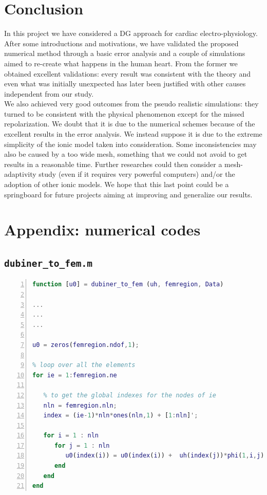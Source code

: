 \documentclass[a4paper,11pt]{article}
\begin{document}
\section{Conclusion}
In this project we have considered a DG approach for cardiac electro-physiology. After some introductions and motivations, we have validated the proposed numerical method through a basic error analysis and a couple of simulations aimed to re-create what happens in the human heart.
\noindent From the former we obtained excellent validations: every result was consistent with the theory and even what was initially unexpected has later been justified with other causes independent from our study.\\
\noindent We also achieved very good outcomes from the pseudo realistic simulations: they turned to be consistent with the physical phenomenon except for the missed repolarization. We doubt that it is due to the numerical schemes because of the excellent results in the error analysis. We instead suppose it is due to the extreme simplicity of the ionic model taken into consideration. Some inconsistencies may also be caused by a too wide mesh, something that we could not avoid to get results in a reasonable time. Further researches could then consider a mesh-adaptivity study (even if it requires very powerful computers) and/or the adoption of other ionic models.
\noindent We hope that this last point could be a springboard for future projects aiming at improving and generalize our results.  
\newpage
\section{Appendix: numerical codes}
\subsection{\texttt{dubiner\_to\_fem.m}}\label{dub_to_fem}
\begin{lstlisting}[language=Matlab,basicstyle=\small, numbers=left, numberstyle=\tiny,  name = dubiner_to_fem.m, frame=single]
function [u0] = dubiner_to_fem (uh, femregion, Data)  
	
...
...
...
	
u0 = zeros(femregion.ndof,1);
	
% loop over all the elements
for ie = 1:femregion.ne
	
   % to get the global indexes for the nodes of ie 
   nln = femregion.nln;
   index = (ie-1)*nln*ones(nln,1) + [1:nln]';
	
   for i = 1 : nln
      for j = 1 : nln
         u0(index(i)) = u0(index(i)) +  uh(index(j))*phi(1,i,j);
      end
   end
end
\end{lstlisting} 
\end{document}
